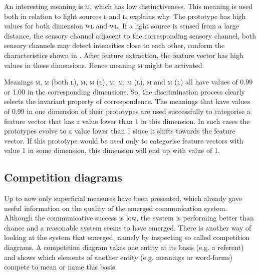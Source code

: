 An interesting meaning is {\scshape m}, which has low distinctiveness. This meaning is used both in relation to light sources \textsc{l} and \textsc{l}.  explains why. The prototype has high values for both dimension {\scshape wl} and {\scshape wl}. If a light source is sensed from a large distance, the sensory channel adjacent to the corresponding sensory channel, both sensory channels may detect intensities close to each other, conform the characteristics shown in . After feature extraction, the feature vector has high values in these dimensions. Hence meaning {\scshape m} might be activated. 

Meanings {\scshape m}, {\scshape m} (both \textsc{l}), {\scshape m}, {\scshape m} (\textsc{l}), {\scshape m}, {\scshape m}, {\scshape m} (\textsc{l}), {\scshape m} and {\scshape m} (\textsc{l}) all have values of 0.99 or 1.00 in the corresponding dimensions.  So, the discrimination process clearly selects the invariant property of correspondence. The meanings that have values of 0.99 in one dimension of their prototypes are used successfully to categorise a feature vector that has a value lower than 1 in this dimension. In such cases the prototypes evolve to a value lower than 1 since it shifts towards the feature vector. If this prototype would be used only to categorise feature vectors with value 1 in some dimension, this dimension will end up with value of 1.


\subsection{Competition diagrams}\label{s:basic:comp}

Up to now only superficial measures have been presented, which already gave useful information on the quality of the emerged communication system. Although the communicative success is low, the system is performing better than chance and a reasonable system seems to have emerged. There is another way of looking at the system that emerged, namely by inspecting so called {\sc competition diagrams}. A competition diagram takes one entity at its basis (e.g. a referent) and shows which elements of another entity (e.g. meanings or word-forms) compete to mean or name this basis.

